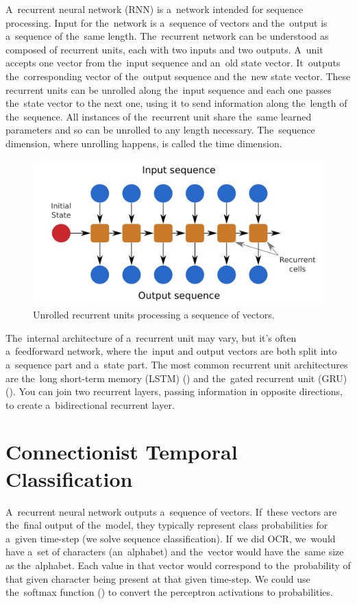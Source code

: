 A~recurrent neural network (RNN) is a~network intended for sequence processing. Input for the~network is a~sequence of vectors and the~output is a~sequence of the~same length. The~recurrent network can be understood as composed of recurrent units, each with two inputs and two outputs. A~unit accepts one vector from the~input sequence and an~old state vector. It~outputs the~corresponding vector of the~output sequence and the~new state vector. These recurrent units can be unrolled along the~input sequence and each one passes the~state vector to the next one, using it to send information along the~length of the~sequence. All instances of the~recurrent unit share the~same learned parameters and so can be unrolled to any length necessary. The~sequence dimension, where unrolling happens, is called the time dimension.

\begin{figure}[h]
    \centering
    \includegraphics[width=140mm]{../img/recurrent-network}
    \caption{Unrolled recurrent units processing a sequence of vectors.}
    \label{fig3:RecurrentNetwork}
\end{figure}

The~internal architecture of a~recurrent unit may vary, but it's often a~feedforward network, where the~input and output vectors are both split into a~sequence part and a~state part. The most common recurrent unit architectures are the~long short-term memory (LSTM) (\cite{LSTM}) and the~gated recurrent unit (GRU) (\cite{GRU}). You can join two recurrent layers, passing information in opposite directions, to create a~bidirectional recurrent layer.


\section{Connectionist Temporal Classification}

A~recurrent neural network outputs a~sequence of vectors. If~these vectors are the~final output of the~model, they typically represent class probabilities for a~given time-step (we solve sequence classification). If~we did OCR, we~would have a~set of characters (an~alphabet) and the~vector would have the~same size as the~alphabet. Each value in that vector would correspond to the~probability of that given character being present at that given time-step. We could use the~softmax function (\cite{Goodfellow-et-al-2016}) to convert the perceptron activations to probabilities.

